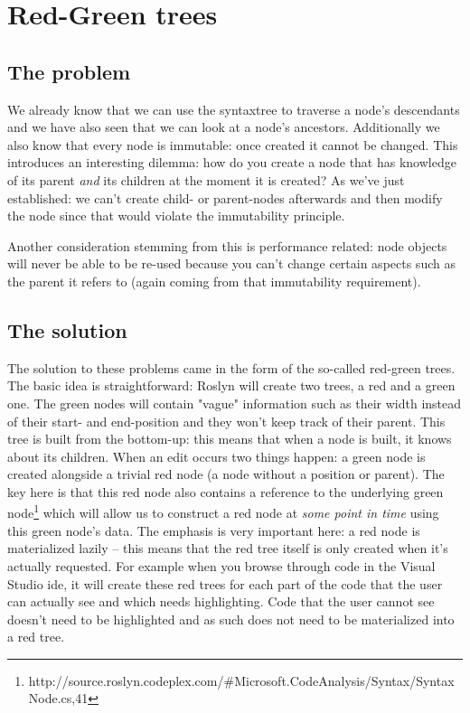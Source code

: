 \section{Red-Green trees}
\label{sec:red-green-trees}

\subsection{The problem}
\label{sec:rg-trees-problem}

We already know that we can use the \gls{syntaxtree} to traverse a node's descendants and we have also seen that we can look at a node's ancestors. Additionally we also know that every node is \gls{immutable}: once created it cannot be changed. This introduces an interesting dilemma: how do you create a node that has knowledge of its parent \textit{and} its children at the moment it is created? As we've just established: we can't create child- or parent-nodes afterwards and then modify the node since that would violate the immutability principle.

Another consideration stemming from this is performance related: node objects will never be able to be re-used because you can't change certain aspects such as the parent it refers to (again coming from that immutability requirement).

\subsection{The solution}
\label{sec:rg-trees-solution}

The solution to these problems came in the form of the so-called red-green trees. The basic idea is straightforward: Roslyn will create two trees, a red and a green one. The green nodes will contain "vague" information such as their width instead of their start- and end-position and they won't keep track of their parent. This tree is built from the bottom-up: this means that when a node is built, it knows about its children.
When an edit occurs two things happen: a green node is created alongside a trivial red node (a node without a position or parent). The key here is that this red node also contains a reference to the underlying green node\footnote{http://source.roslyn.codeplex.com/\#Microsoft.CodeAnalysis/Syntax/SyntaxNode.cs,41} which will allow us to construct a red node at \textit{some point in time} using this green node's data.  
The emphasis is very important here: a red node is materialized lazily -- this means that the red tree itself is only created when it's actually requested. For example when you browse through code in the Visual Studio \gls{ide}, it will create these red trees for each part of the code that the user can actually see and which needs highlighting. Code that the user cannot see doesn't need to be highlighted and as such does not need to be materialized into a red tree.


